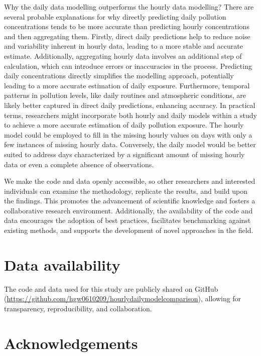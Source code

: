 \documentclass[
  12,
]{article}
\begin{document}
Why the daily data modelling outperforms the hourly data modelling?
There are several probable explanations for why directly predicting
daily pollution concentrations tends to be more accurate than predicting
hourly concentrations and then aggregating them. Firstly, direct daily
predictions help to reduce noise and variability inherent in hourly
data, leading to a more stable and accurate estimate. Additionally,
aggregating hourly data involves an additional step of calculation,
which can introduce errors or inaccuracies in the process. Predicting
daily concentrations directly simplifies the modelling approach,
potentially leading to a more accurate estimation of daily exposure.
Furthermore, temporal patterns in pollution levels, like daily routines
and atmospheric conditions, are likely better captured in direct daily
predictions, enhancing accuracy. In practical terms, researchers might
incorporate both hourly and daily models within a study to achieve a
more accurate estimation of daily pollution exposure. The hourly model
could be employed to fill in the missing hourly values on days with only
a few instances of missing hourly data. Conversely, the daily model
would be better suited to address days characterized by a significant
amount of missing hourly data or even a complete absence of
observations.

We make the code and data openly accessible, so other researchers and
interested individuals can examine the methodology, replicate the
results, and build upon the findings. This promotes the advancement of
scientific knowledge and fosters a collaborative research environment.
Additionally, the availability of the code and data encourages the
adoption of best practices, facilitates benchmarking against existing
methods, and supports the development of novel approaches in the field.

\hypertarget{data-availability}{%
\section*{Data availability}\label{data-availability}}

The code and data used for this study are publicly shared on GitHub
(\url{https://github.com/hgw0610209/hourlydailymodelcomparison}),
allowing for transparency, reproducibility, and collaboration.

\hypertarget{acknowledgements}{%
\section*{Acknowledgements}\label{acknowledgements}}
\end{document}
